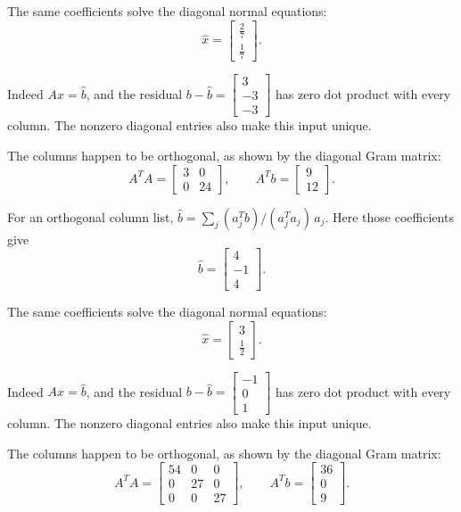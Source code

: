 The same coefficients solve the diagonal normal equations:
\[ \widehat x=\begin{bmatrix}\frac{2}{7}\\\frac{1}{7}\end{bmatrix}.\]

Indeed $A\widehat x=\widehat b$, and the residual $b-\widehat b=\begin{bmatrix}3\\-3\\-3\end{bmatrix}$ has zero dot product with every column. The nonzero diagonal entries also make this input unique.

The columns happen to be orthogonal, as shown by the diagonal Gram matrix:
\[ A^TA=\begin{bmatrix}3 & 0\\0 & 24\end{bmatrix},\qquad A^Tb=\begin{bmatrix}9\\12\end{bmatrix}.\]

For an orthogonal column list, $\widehat b=\sum_j(a_j^Tb)/(a_j^Ta_j)\,a_j$. Here those coefficients give
\[ \widehat b=\begin{bmatrix}4\\-1\\4\end{bmatrix}.\]

The same coefficients solve the diagonal normal equations:
\[ \widehat x=\begin{bmatrix}3\\\frac{1}{2}\end{bmatrix}.\]

Indeed $A\widehat x=\widehat b$, and the residual $b-\widehat b=\begin{bmatrix}-1\\0\\1\end{bmatrix}$ has zero dot product with every column. The nonzero diagonal entries also make this input unique.

The columns happen to be orthogonal, as shown by the diagonal Gram matrix:
\[ A^TA=\begin{bmatrix}54 & 0 & 0\\0 & 27 & 0\\0 & 0 & 27\end{bmatrix},\qquad A^Tb=\begin{bmatrix}36\\0\\9\end{bmatrix}.\]

